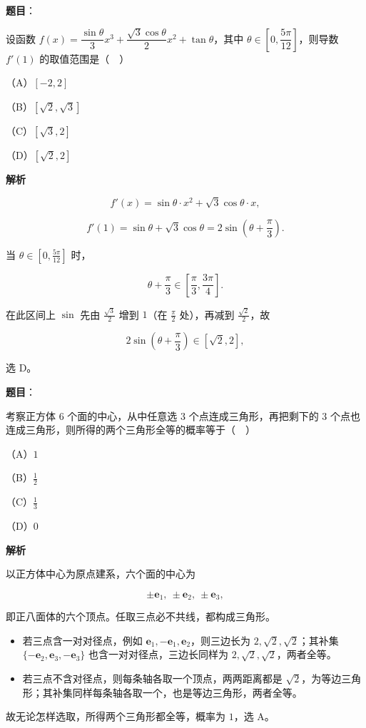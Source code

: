 \begin{answer}

\textbf{题目}：

设函数 $f(x)=\dfrac{\sin\theta}{3}x^3+\dfrac{\sqrt3\cos\theta}{2}x^2+\tan\theta$，其中 $\theta\in\left[0,\dfrac{5\pi}{12}\right]$，则导数 $f'(1)$ 的取值范围是（　）

（A）$[-2,2]$

（B）$[\sqrt2,\sqrt3]$

（C）$[\sqrt3,2]$

（D）$[\sqrt2,2]$

\textbf{解析}

\nopagebreak[4]
\[f'(x)=\sin\theta\cdot x^2+\sqrt3\cos\theta\cdot x,\]

\nopagebreak[4]
\[f'(1)=\sin\theta+\sqrt3\cos\theta=2\sin\left(\theta+\frac\pi3\right).\]

当 $\theta\in\left[0,\frac{5\pi}{12}\right]$ 时，

\nopagebreak[4]
\[\theta+\frac\pi3\in\left[\frac\pi3,\frac{3\pi}{4}\right].\]

在此区间上 $\sin$ 先由 $\frac{\sqrt3}{2}$ 增到 $1$（在 $\frac\pi2$ 处），再减到 $\frac{\sqrt2}{2}$，故

\nopagebreak[4]
\[2\sin\left(\theta+\frac\pi3\right)\in[\sqrt2,2],\]

选 D。


\end{answer}
\begin{answer}

\textbf{题目}：

考察正方体 $6$ 个面的中心，从中任意选 $3$ 个点连成三角形，再把剩下的 $3$ 个点也连成三角形，则所得的两个三角形全等的概率等于（　）

（A）$1$

（B）$\frac12$

（C）$\frac13$

（D）$0$

\textbf{解析}

以正方体中心为原点建系，六个面的中心为

\nopagebreak[4]
\[\pm\boldsymbol e_1,\ \pm\boldsymbol e_2,\ \pm\boldsymbol e_3,\]

即正八面体的六个顶点。任取三点必不共线，都构成三角形。

\begin{itemize}
\item 若三点含一对对径点，例如 $\boldsymbol e_1,-\boldsymbol e_1,\boldsymbol e_2$，则三边长为 $2,\sqrt2,\sqrt2$；其补集 $\{-\boldsymbol e_2,\boldsymbol e_3,-\boldsymbol e_3\}$ 也含一对对径点，三边长同样为 $2,\sqrt2,\sqrt2$，两者全等。
\item 若三点不含对径点，则每条轴各取一个顶点，两两距离都是 $\sqrt2$，为等边三角形；其补集同样每条轴各取一个，也是等边三角形，两者全等。
\end{itemize}

故无论怎样选取，所得两个三角形都全等，概率为 $1$，选 A。


\end{answer}
